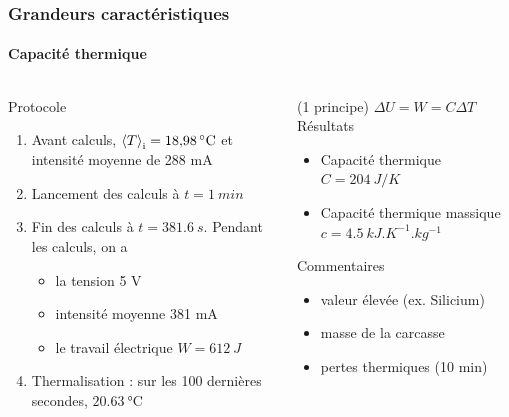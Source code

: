 \documentclass[a4paper,11pt]{beamer}
\newcommand{\moy}{\expval}
\newcommand{\cel}{\degreeCelsius}
\begin{document}
\begin{frame}
    \frametitle{Grandeurs caractéristiques}
    \framesubtitle{Capacité thermique}

    \begin{columns}
        \begin{column}{0.5\textwidth}
            Protocole
            \begin{enumerate}
                \item Avant calculs, $\moy{T}_\text{i} = \SI{18,98}{\cel}$ et intensité moyenne de 288 mA
                \item Lancement des calculs à $t = \SI{1}{min}$
                \item Fin des calculs à $t = \SI{381,6}{s}$. Pendant les calculs, on a
                \begin{itemize}
                    \item la tension 5 V
                    \item intensité moyenne 381 mA
                    \item le travail électrique $W = \SI{612}{J}$
                \end{itemize}
                \item Thermalisation : sur les 100 dernières secondes, $\SI{20,63}{\cel}$
            \end{enumerate}
        \end{column}
        \vrule{}
        \begin{column}{0.5\textwidth}
            (1\ier{} principe) $\Delta U = W = C \Delta T$
            Résultats
            \begin{itemize}
                \item Capacité thermique $C = \SI{204}{J/K}$
                \item Capacité thermique massique $c = \SI{4,5}{kJ.K^{-1}.kg^{-1}}$
            \end{itemize}
            Commentaires
            \begin{itemize}
                \item valeur élevée (ex. Silicium)
                \item masse de la carcasse
                \item pertes thermiques (10 min)
            \end{itemize}
        \end{column}
    \end{columns}
\end{frame}
\end{document}
